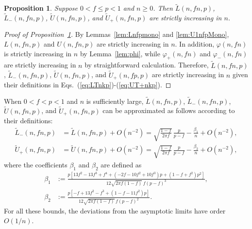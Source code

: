 \documentclass[aop]{imsart}
\theoremstyle{plain}
\newtheorem{proposition}[theorem]{Proposition}
\theoremstyle{remark}
\newcommand{\1}{\operatorname{\uppercase\expandafter{\romannumeral1}}}
\newcommand{\2}{\operatorname{\uppercase\expandafter{\romannumeral2}}}
\newcommand{\3}{\operatorname{\uppercase\expandafter{\romannumeral3}}}
\newcommand{\4}{\operatorname{\uppercase\expandafter{\romannumeral4}}}
\newcommand{\5}{\operatorname{\uppercase\expandafter{\romannumeral5}}}
\newcommand{\6}{\operatorname{\uppercase\expandafter{\romannumeral6}}}
\newcommand{\7}{\operatorname{\uppercase\expandafter{\romannumeral7}}}
\newcommand{\8}{\operatorname{\uppercase\expandafter{\romannumeral8}}}
\newcommand{\9}{\operatorname{\uppercase\expandafter{\romannumeral9}}}
\def\eqref#1{\textup{(\ref{#1})}}
\newcommand{\lref}[1]{Lemma~\ref{#1}}
\newcommand{\lsref}[1]{Lemmas~\ref{#1}}
\newcommand{\pref}[1]{Proposition~\ref{#1}}
\begin{document}
\begin{proposition}\label{pro:LUTmono}
	Suppose $0<f\leq p<1$ and $n\geq 0$.  Then $\tilde{L}(n,fn,p)$, $\tilde{L}_-(n,fn,p)$, $\tilde{U}(n,fn,p)$, and $\tilde{U}_+(n,fn,p)$ are  strictly increasing in $n$. 	
\end{proposition}

\begin{proof}[Proof of \pref{pro:LUTmono}]
By \lsref{lem:Lnfpmono} and \ref{lem:U1nfpMono}, $L(n,fn,p)$ and $U(n,fn,p)$ are strictly increasing in $n$. In addition, $\varphi(n,fn)$ is strictly increasing in $n$ by \lref{lem:phi}, while  $\varphi_+(n,fn)$ and $\varphi_-(n,fn)$ are strictly increasing in $n$ by straightforward calculation. 
 Therefore, $\tilde{L}(n,fn,p)$, $\tilde{L}_-(n,fn,p)$,  $\tilde{U}(n,fn,p)$, and $\tilde{U}_+(n,fp,p)$ are  strictly increasing in $n$ given their definitions in Eqs.~\eqref{eq:LTnkp}-\eqref{eq:UT+nkp}.  
\end{proof}


When $0<f<p<1$ and $n$ is sufficiently large, $\tilde{L}(n,fn,p)$,  $\tilde{L}_-(n,fn,p)$,  $\tilde{U}(n,fn,p)$, and $\tilde{U}_+(n,fn,p)$ can be approximated 
as  follows according to their definitions: 
\begin{align}
\tilde{L}_-(n,fn,p)&=\tilde{L}(n,fn,p)+O(n^{-2})=\sqrt{\frac{1-f}{2\pi f}}\,\frac{p}{p-f}-\frac{\beta_1}{n}+O(n^{-2}),\\
\tilde{U}_+(n,fn,p)&=\tilde{U}(n,fn,p)+O(n^{-2})=\sqrt{\frac{1-f}{2\pi f}}\,\frac{p}{p-f}
-\frac{\beta_2}{n}+O(n^{-2}),
\end{align}
where the coefficients $\beta_1$ and $\beta_2$ are defined as
\begin{align}
\beta_1&:=\frac{p[13 f^2 - 13 f^3 + f^4 + (-2 f - 10 f^2 + 10 f^3) p + (1 - f + f^2) p^2]}{12\sqrt{2\pi f(1-f)}\,f(p-f)^3},\\ 
\beta_2&:=\frac{p[-f + 13 f^2 - f^3 + (1 - f - 11 f^2) p]}{12\sqrt{2\pi f(1-f)}\,f(p-f)^2}.
\end{align}
For all these bounds, the deviations from the asymptotic limits have order $O(1/n)$.
\end{document}
